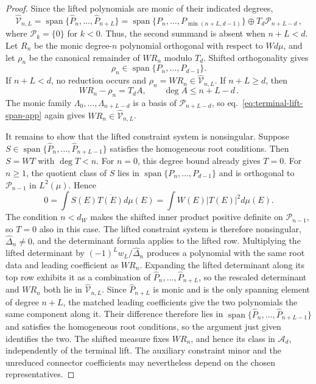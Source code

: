 \documentclass[a4paper,11pt]{article}
\def\dd{d}%
\theoremstyle{definition}
\theoremstyle{remark}
\newcommand{\dd}{\mathrm d}
\newcommand{\cA}{\mathcal A}
\newcommand{\cP}{\mathcal P}
\newcommand{\Span}{\operatorname{span}}
\begin{document}
\begin{proof}
Since the lifted polynomials are monic of their indicated degrees,
\begin{equation}
   \widehat{\mathcal V}_{n,L}
   =\Span\{\widehat P_n,\ldots,\widehat P_{n+L}\}
   =\Span\{P_n,\ldots,P_{\min(n+L,d-1)}\}
   \oplus T_d\cP_{n+L-d}\,,
   \label{eq:terminal-lift-span-app}
\end{equation}
where $\cP_k=\{0\}$ for $k<0$. Thus, the second summand is absent when $n+L<d$. Let $R_n$ be the monic degree-$n$ polynomial orthogonal with respect to $W\dd\mu$, and let $\rho_n$ be the canonical remainder of $WR_n$ modulo $T_d$. Shifted orthogonality gives
\begin{equation}
   \rho_n\in\Span\{P_n,\ldots,P_{d-1}\}.
\end{equation}
If $n+L<d$, no reduction occurs and $\rho_n=WR_n\in\widehat{\mathcal V}_{n,L}$. If $n+L\ge d$, then
\begin{equation}
   WR_n-\rho_n=T_dA,
   \qquad
   \deg A\le n+L-d\,.
\end{equation}
The monic family $\Lambda_0,\ldots,\Lambda_{n+L-d}$ is a basis of $\cP_{n+L-d}$, so eq.~\eqref{eq:terminal-lift-span-app} again gives $WR_n\in\widehat{\mathcal V}_{n,L}$.

It remains to show that the lifted constraint system is nonsingular. Suppose $S\in\Span\{\widehat P_n,\ldots,\widehat P_{n+L-1}\}$ satisfies the homogeneous root conditions. Then $S=WT$ with $\deg T<n$. For $n=0$, this degree bound already gives $T=0$. For $n\ge1$, the quotient class of $S$ lies in $\Span\{P_n,\ldots,P_{d-1}\}$ and is orthogonal to $\cP_{n-1}$ in $L^2(\mu)$. Hence
\begin{equation}
   0=\int S(E)\overline{T(E)}\dd\mu(E)
   =\int W(E)|T(E)|^2\dd\mu(E).
\end{equation}
The condition $n<d_W$ makes the shifted inner product positive definite on $\cP_{n-1}$, so $T=0$ also in this case. The lifted constraint system is therefore nonsingular, $\widehat\Delta_n\ne0$, and the determinant formula applies to the lifted row. Multiplying the lifted determinant by $(-1)^Lw_L/\widehat\Delta_n$ produces a polynomial with the same root data and leading coefficient as $WR_n$. Expanding the lifted determinant along its top row exhibits it as a combination of $\widehat P_n,\ldots,\widehat P_{n+L}$, so the rescaled determinant and $WR_n$ both lie in $\widehat{\mathcal V}_{n,L}$. Since $\widehat P_{n+L}$ is monic and is the only spanning element of degree $n+L$, the matched leading coefficients give the two polynomials the same component along it. Their difference therefore lies in $\Span\{\widehat P_n,\ldots,\widehat P_{n+L-1}\}$ and satisfies the homogeneous root conditions, so the argument just given identifies the two. The shifted measure fixes \(WR_n\), and hence its class in \(\cA_d\), independently of the terminal lift. The auxiliary constraint minor and the unreduced connector coefficients may nevertheless depend on the chosen representatives.
\end{proof}
\end{document}
